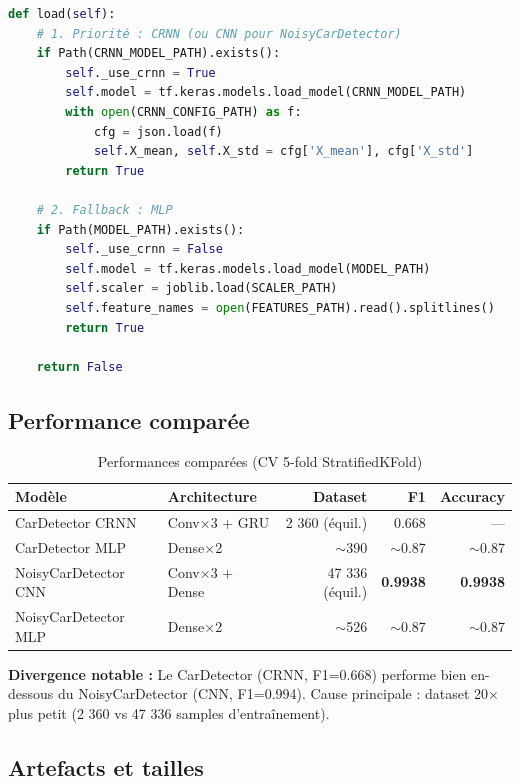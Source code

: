 \documentclass[11pt,a4paper]{article}
\newcommand{\ok}[1]{\textcolor{green!50!black}{\textbf{#1}}}
\begin{document}
\begin{lstlisting}[language=Python,caption={Logique de chargement dual}]
def load(self):
    # 1. Priorité : CRNN (ou CNN pour NoisyCarDetector)
    if Path(CRNN_MODEL_PATH).exists():
        self._use_crnn = True
        self.model = tf.keras.models.load_model(CRNN_MODEL_PATH)
        with open(CRNN_CONFIG_PATH) as f:
            cfg = json.load(f)
            self.X_mean, self.X_std = cfg['X_mean'], cfg['X_std']
        return True

    # 2. Fallback : MLP
    if Path(MODEL_PATH).exists():
        self._use_crnn = False
        self.model = tf.keras.models.load_model(MODEL_PATH)
        self.scaler = joblib.load(SCALER_PATH)
        self.feature_names = open(FEATURES_PATH).read().splitlines()
        return True

    return False
\end{lstlisting}

\subsection{Performance comparée}

\begin{table}[htbp]
\centering
\begin{tabular}{@{}llrrr@{}}
\toprule
\textbf{Modèle} & \textbf{Architecture} & \textbf{Dataset} & \textbf{F1} & \textbf{Accuracy} \\
\midrule
CarDetector CRNN & Conv$\times$3 + GRU & 2 360 (équil.) & 0.668 & — \\
CarDetector MLP & Dense$\times$2 & $\sim$390 & $\sim$0.87 & $\sim$0.87 \\
NoisyCarDetector CNN & Conv$\times$3 + Dense & 47 336 (équil.) & \ok{0.9938} & \ok{0.9938} \\
NoisyCarDetector MLP & Dense$\times$2 & $\sim$526 & $\sim$0.87 & $\sim$0.87 \\
\bottomrule
\end{tabular}
\caption{Performances comparées (CV 5-fold StratifiedKFold)}
\end{table}

\begin{warningbox}
\textbf{Divergence notable :} Le CarDetector (CRNN, F1=0.668) performe bien en-dessous du
NoisyCarDetector (CNN, F1=0.994). Cause principale : dataset 20$\times$ plus petit (2 360 vs
47 336 samples d'entraînement).
\end{warningbox}

\subsection{Artefacts et tailles}
\end{document}
